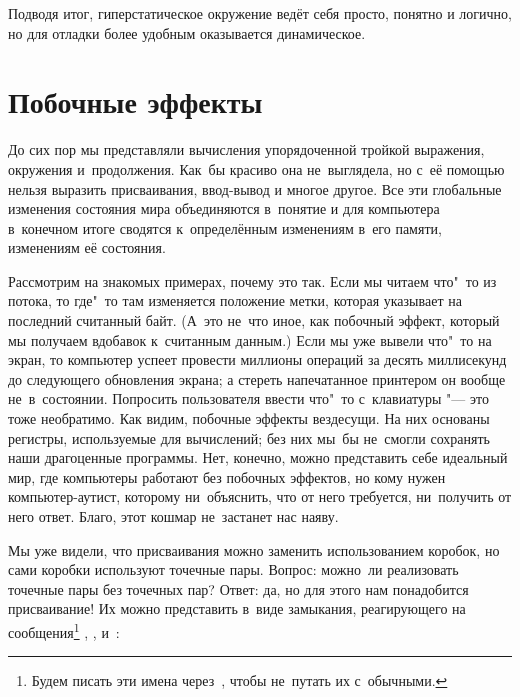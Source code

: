 Подводя итог, гиперстатическое окружение ведёт себя просто, понятно и логично,
но для отладки более удобным оказывается динамическое.


\section{Побочные эффекты}\label{assignment/sect:side-effects}

До сих пор мы представляли вычисления упорядоченной тройкой выражения, окружения
и~продолжения. Как~бы красиво она не~выглядела, но с~её помощью нельзя выразить
присваивания, ввод-вывод и многое другое. Все эти глобальные изменения состояния
мира объединяются в~понятие  и для компьютера в~конечном
итоге сводятся к~определённым изменениям в~его памяти, изменениям её состояния.

Рассмотрим на знакомых примерах, почему это так. Если мы читаем что"~то из
потока, то где"~то там изменяется положение метки, которая указывает на
последний считанный байт. (А~это не~что иное, как побочный эффект, который мы
получаем вдобавок к~считанным данным.) Если мы уже вывели что"~то на экран, то
компьютер успеет провести миллионы операций за десять миллисекунд до следующего
обновления экрана; а стереть напечатанное принтером он вообще не~в~состоянии.
Попросить пользователя ввести что"~то с~клавиатуры "--- это тоже необратимо. Как
видим, побочные эффекты вездесущи. На них основаны регистры, используемые для
вычислений; без них мы~бы не~смогли сохранять наши драгоценные программы. Нет,
конечно, можно представить себе идеальный мир, где компьютеры работают без
побочных эффектов, но кому нужен компьютер-аутист, которому ни~объяснить, что от
него требуется, ни~получить от него ответ. Благо, этот кошмар не~застанет нас
наяву.

Мы уже видели, что присваивания можно заменить использованием коробок, но сами
коробки используют точечные пары. Вопрос: можно~ли реализовать точечные пары без
точечных пар? Ответ: да, но для этого нам понадобится присваивание! Их можно
представить в~виде замыкания, реагирующего на сообщения\footnote{Будем писать
эти имена через~, чтобы не~путать их с~обычными.} , ,
 и~:


